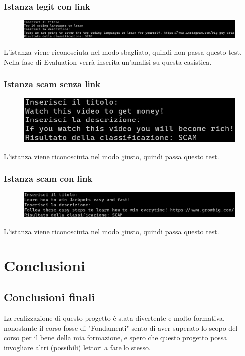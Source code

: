 \documentclass[a4paper,12pt]{report}
\begin{document}
\subsection{Istanza legit con link}
\begin{figure}[h]
\centering
\includegraphics[width=\textwidth]{deploy_legit_link.png}
\end{figure}
L'istanza viene riconosciuta nel modo sbagliato, quindi non passa questo test.\\
Nella fase di Evaluation verrà inserita un'analisi su questa casistica.
\newpage
\subsection{Istanza scam senza link}
\begin{figure}[h]
\centering
\includegraphics[width=\textwidth]{deploy_scam_nolink.png}
\end{figure}
L'istanza viene riconosciuta nel modo giusto, quindi passa questo test.
\subsection{Istanza scam con link}
\begin{figure}[h]
\centering
\includegraphics[width=\textwidth]{deploy_scam_link.png}
\end{figure}
L'istanza viene riconosciuta nel modo giusto, quindi passa questo test.
\newpage

\begingroup%
\makeatletter%
\let\clearpage\relax%
\vspace*{\fill}%
\vspace*{\dimexpr-50\p@-\baselineskip}%
\chapter{Conclusioni}
\vspace*{\fill}%
\endgroup
\newpage

\section{Conclusioni finali}
La realizzazione di questo progetto è stata divertente e molto formativa, nonostante il corso fosse di "Fondamenti" sento di aver superato lo scopo del corso per il bene della mia formazione, e spero che questo progetto possa invogliare altri (possibili) lettori a fare lo stesso.
\end{document}
